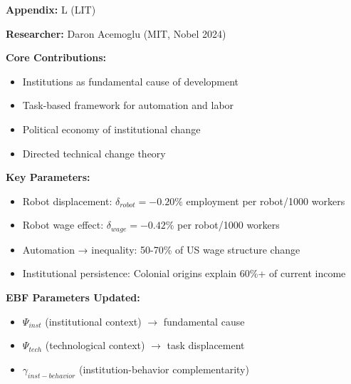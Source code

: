 \begin{tcolorbox}[colback=gray!5!white,colframe=gray!75!black,title=Quick Reference]
\textbf{Appendix:} L (LIT)

\textbf{Researcher:} Daron Acemoglu (MIT, Nobel 2024)

\textbf{Core Contributions:}
\begin{itemize}
    \item Institutions as fundamental cause of development
    \item Task-based framework for automation and labor
    \item Political economy of institutional change
    \item Directed technical change theory
\end{itemize}

\textbf{Key Parameters:}
\begin{itemize}
    \item Robot displacement: $\delta_{robot} = -0.20\%$ employment per robot/1000 workers
    \item Robot wage effect: $\delta_{wage} = -0.42\%$ per robot/1000 workers
    \item Automation → inequality: 50-70\% of US wage structure change
    \item Institutional persistence: Colonial origins explain 60\%+ of current income
\end{itemize}

\textbf{EBF Parameters Updated:}
\begin{itemize}
    \item $\Psi_{inst}$ (institutional context) $\rightarrow$ fundamental cause
    \item $\Psi_{tech}$ (technological context) $\rightarrow$ task displacement
    \item $\gamma_{inst-behavior}$ (institution-behavior complementarity)
\end{itemize}
\end{tcolorbox}


